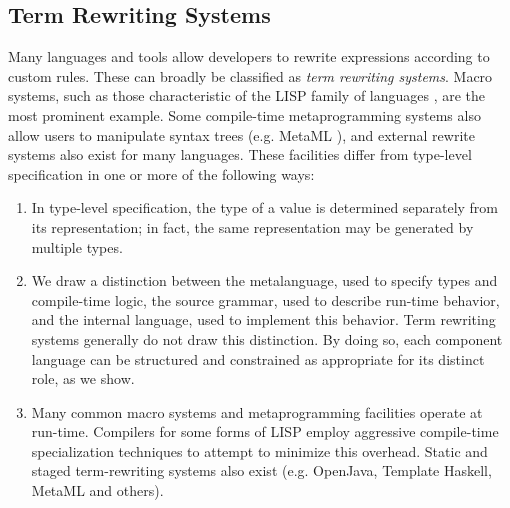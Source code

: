 \documentclass{llncs}
\begin{document}
\subsection{Term Rewriting Systems}
Many languages and tools allow developers to rewrite expressions according to custom rules. These can broadly be classified as {\it term rewriting systems}. Macro systems, such as those characteristic of the LISP family of languages \cite{mccarthy1978history}, are the most prominent example. Some compile-time metaprogramming systems also allow users to manipulate syntax trees (e.g. MetaML \cite{Sheard:1999:UMS}), and external rewrite systems also exist for many languages.
These facilities differ from type-level specification in one or more of the following ways:

\begin{enumerate}
\item In type-level specification, the type of a value is determined separately from its representation; in fact, the same representation may be generated by multiple types. 
\item We draw a distinction between the metalanguage, used to specify types and compile-time logic, the source grammar, used to describe run-time behavior, and the internal language, used to implement this behavior. Term rewriting systems generally do not draw this distinction. By doing so, each component language can be structured and constrained as appropriate for its distinct role, as we show.
\item Many common macro systems and metaprogramming facilities operate at run-time. Compilers for some forms of LISP employ aggressive compile-time specialization techniques to attempt to minimize this overhead. Static and staged term-rewriting systems also exist (e.g. OpenJava\cite{TatM:OpenJCBMSJ}, Template Haskell\cite{SheardPeytonJones:Haskell-02}, MetaML \cite{Sheard:1999:UMS} and others). 
\end{enumerate}
\end{document}
